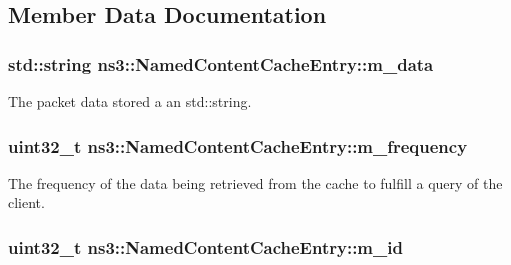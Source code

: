 \subsection{Member Data Documentation}
\hypertarget{classns3_1_1NamedContentCacheEntry_a4cd486a2576f324c55e98a0af5bd97dc}{
\subsubsection[{m\-\_\-data}]{\setlength{\rightskip}{0pt plus 5cm}std\-::string ns3\-::\-Named\-Content\-Cache\-Entry\-::m\-\_\-data\hspace{0.3cm}{\ttfamily [private]}}}\label{classns3_1_1NamedContentCacheEntry_a4cd486a2576f324c55e98a0af5bd97dc}


The packet data stored a an std\-::string. 

\hypertarget{classns3_1_1NamedContentCacheEntry_a40892bae510bf08afedf818012291802}{
\subsubsection[{m\-\_\-frequency}]{\setlength{\rightskip}{0pt plus 5cm}uint32\-\_\-t ns3\-::\-Named\-Content\-Cache\-Entry\-::m\-\_\-frequency\hspace{0.3cm}{\ttfamily [private]}}}\label{classns3_1_1NamedContentCacheEntry_a40892bae510bf08afedf818012291802}


The frequency of the data being retrieved from the cache to fulfill a query of the client. 

\hypertarget{classns3_1_1NamedContentCacheEntry_a9fa45d5bfcc9a43f72beae36ce5fdba4}{
\subsubsection[{m\-\_\-id}]{\setlength{\rightskip}{0pt plus 5cm}uint32\-\_\-t ns3\-::\-Named\-Content\-Cache\-Entry\-::m\-\_\-id\hspace{0.3cm}{\ttfamily [private]}}}\label{classns3_1_1NamedContentCacheEntry_a9fa45d5bfcc9a43f72beae36ce5fdba4}


